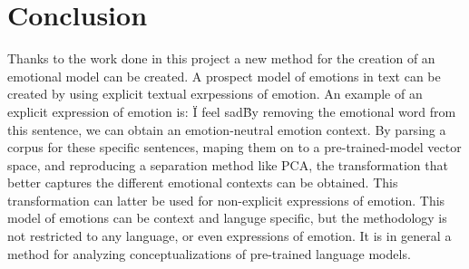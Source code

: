 \chapter{Conclusion}\label{chap:Conclusion}





Thanks to the work done in this project a new method for the creation of an emotional model can be created. A prospect model of emotions in text can be created by using explicit textual exrpessions of emotion. An example of an explicit expression of emotion is: \"I feel sad\" By removing the emotional word from this sentence, we can obtain an emotion-neutral emotion context. By parsing a corpus for these specific sentences, maping them on to a pre-trained-model vector space, and reproducing a separation method like PCA, the transformation that better captures the different emotional contexts can be obtained. This transformation can latter be used for non-explicit expressions of emotion.
This model of emotions can be context and languge specific, but the methodology is not restricted to any language, or even expressions of emotion. It is in general a method for analyzing conceptualizations of pre-trained language models.




